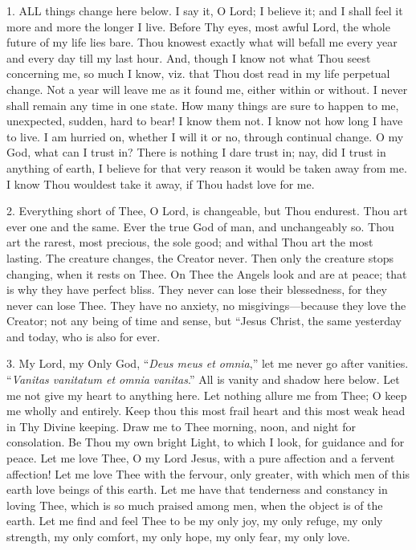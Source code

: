 
1. ALL
things change here below. I say it, O Lord; I believe it; and I shall
feel it more and more the longer I live. Before Thy eyes, most awful
Lord, the whole future of my life lies bare. Thou knowest exactly what
will befall me every year and every day till my last hour. And, though I
know not what Thou seest concerning me, so much I know, viz. that Thou
dost read in my life perpetual change. Not a year will leave me as it
found me, either within or without. I never shall remain any time in one
state. How many things are sure to happen to me, unexpected, sudden,
hard to bear! I know them not. I know not how long I have to live. I am
hurried on, whether I will it or no, through continual change. O my God,
what can I trust in? There is nothing I dare trust in; nay, did I trust
in anything of earth, I believe for that very reason it would be taken
away from me. I know Thou wouldest take it away, if Thou hadst love for
me.

2. Everything short of Thee, O
Lord, is changeable, but Thou endurest. Thou art ever one and the same.
Ever the true God of man, and unchangeably so. Thou art the rarest, most
precious, the sole good; and withal Thou art the most lasting. The
creature changes, the Creator never. Then only the creature stops
changing, when it rests on Thee. On Thee the Angels look and are at
peace; that is why they have perfect bliss. They never can lose their
blessedness, for they never can lose Thee. They have no anxiety, no
misgivings—because they love the Creator; not any being of time and
sense, but ``Jesus Christ, the same yesterday and today, who is also for
ever.

3. My Lord, my Only God, ``\emph{Deus
meus et omnia},'' let me never go after vanities. ``\emph{Vanitas
vanitatum et omnia} \emph{vanitas}.'' All is vanity and shadow here
below. Let me not give my heart to anything here. Let nothing allure me
from Thee; O keep me wholly and entirely. Keep thou this most frail
heart and this most weak head in Thy Divine keeping. Draw me to Thee
morning, noon, and night for consolation. Be Thou my own bright Light,
to which I look, for guidance and for peace. Let me love Thee, O my Lord
Jesus, with a pure affection and a fervent affection! Let me love Thee
with the fervour, only greater, with which men of this earth love beings
of this earth. Let me have that tenderness and constancy in loving Thee,
which is so much praised among men, when the object is of the earth. Let
me find and feel Thee to be my only joy, my only refuge, my only
strength, my only comfort, my only hope, my only fear, my only love.

